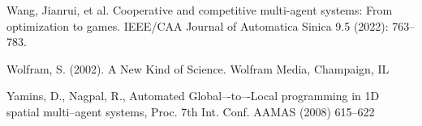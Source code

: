 \documentclass[10pt,a4paper]{article}  %
\begin{document}
\begin{thebibliography}{99}
Wang, Jianrui, et al. 
Cooperative and competitive multi-agent systems: From optimization to games.
IEEE/CAA Journal of Automatica Sinica 9.5 (2022): 763--783.

 Wolfram, S. (2002).
A New Kind of Science.
 Wolfram Media, Champaign, IL

Yamins, D., Nagpal, R., Automated Global–-to–-Local programming in 1D spatial
multi–agent systems, Proc. 7th Int. Conf. AAMAS (2008) 615--622

\end{thebibliography}
\end{document}
